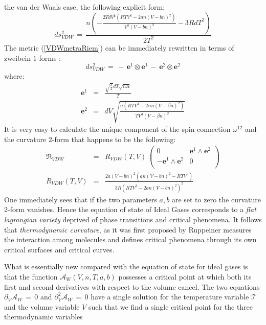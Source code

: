 \documentclass[10pt,a4paper]{article}
\begin{document}
the van der Waals case, the following explicit form:
\begin{equation}\label{VDWmetraRiem}
   ds^2_{VDW}\, = \,  \frac{n \left(-\frac{2 T dV^2 \left(R T V^3-2 a n (V-b n)^2\right)}{V^3 (V-b
   n)^2}-3 R dT^2\right)}{2 T^2}
\end{equation}
The metric (\ref{VDWmetraRiem}) can be immediately rewritten
in terms of  zweibein $1$-forms :
\begin{equation}\label{dsinzweibainVDW}
    ds^2_{VDW}\, = \, - \, \mathbf{e}^1 \otimes \mathbf{e}^1 \, - \,
    \mathbf{e}^2 \otimes \mathbf{e}^2
\end{equation}
where:
\begin{eqnarray}\label{zweibainVDW}
  \mathbf{e}^1 &=& \frac{\sqrt{\frac{3}{2}} dT \sqrt{n R}}{T} \nonumber\\
  \mathbf{e}^2 &=& dV \sqrt{\frac{n \left(R T V^3-2 \alpha  n (V-\beta  n)^2\right)}{T V^3
   (V-\beta  n)^2}}
\end{eqnarray}
It is very easy to calculate the unique component of the spin connection $\omega^{12}$ and the curvature $2$-form
that happens to be the following:
\begin{eqnarray}
\label{Rvandervallo}
  \mathfrak{R}_{VDW} &=& R_{VDW}(T,V)\, \left(
\begin{array}{cc}
 0 & \mathbf{e}^1 \wedge \mathbf{e}^2 \\
 -\mathbf{e}^1 \wedge \mathbf{e}^2 & 0 \\
\end{array}
\right)\nonumber \\
  R_{VDW}(T,V) &=& \frac{2 a (V-b n)^2 \left(a n (V-b n)^2-R T V^3\right)}{3 R \left(R T V^3-2 a n
   (V-b n)^2\right)^2}
\end{eqnarray}
One immediately sees that if the two parameters  $a,b$ are set to zero the curvature $2$-form vanishes.
Hence the equation of state of Ideal Gases corresponds to a \textit{flat lagrangian variety}
deprived of phase transitions and critical phenomena. It follows that \textit{thermodynamic curvature},
as it was first proposed  by  Ruppeiner \cite{Ruppeiner_2010}  measures the interaction among molecules
and defines critical phenomena through its own critical surfaces and critical curves.
\par
What is essentially new compared with the equation of state for ideal gases is that the  function $\mathcal{A}_W\left(V,n,T,a,b\right)$ possesses a critical point at which both its first and second derivatives with respect to the volume cancel. The two equations $\partial_V\mathcal{A}_W\, =\,0$ and $\partial_V^2\mathcal{A}_W\, =\,0$ have a single solution for the temperature variable $\mathcal{T}$  and the volume variable $V$ such that we find a single critical point for the three thermodynamic variables
\end{document}
